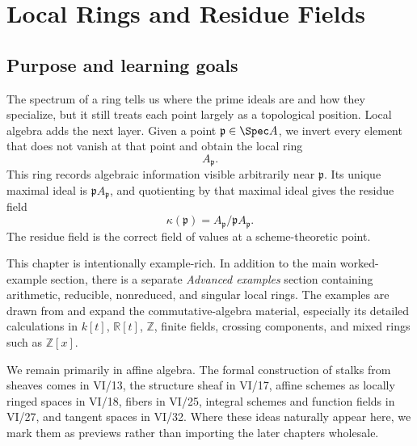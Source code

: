 
\chapter{Local Rings and Residue Fields}
\label{ch:local-rings-residue-fields}
\providecommand{\Nil}{\operatorname{Nil}}

\section*{Purpose and learning goals}

The spectrum of a ring tells us where the prime ideals are and how they specialize, but it
still treats each point largely as a topological position.  Local algebra adds the next layer.
Given a point $\mathfrak p\in\Spec A$, we invert every element that does not vanish at that
point and obtain the local ring
\[
A_{\mathfrak p}.
\]
This ring records algebraic information visible arbitrarily near $\mathfrak p$.  Its unique
maximal ideal is $\mathfrak pA_{\mathfrak p}$, and quotienting by that maximal ideal gives
the residue field
\[
\kappa(\mathfrak p)=A_{\mathfrak p}/\mathfrak pA_{\mathfrak p}.
\]
The residue field is the correct field of values at a scheme-theoretic point.

This chapter is intentionally example-rich.  In addition to the main worked-example section,
there is a separate \emph{Advanced examples} section containing arithmetic, reducible,
nonreduced, and singular local rings.  The examples are drawn from and expand the commutative-algebra material, especially its detailed calculations in $k[t]$, $\mathbb R[t]$,
$\mathbb Z$, finite fields, crossing components, and mixed rings such as $\mathbb Z[x]$.

We remain primarily in affine algebra.  The formal construction of stalks from sheaves comes
in VI/13, the structure sheaf in VI/17, affine schemes as locally ringed spaces in VI/18,
fibers in VI/25, integral schemes and function fields in VI/27, and tangent spaces in VI/32.
Where these ideas naturally appear here, we mark them as previews rather than importing the
later chapters wholesale.


